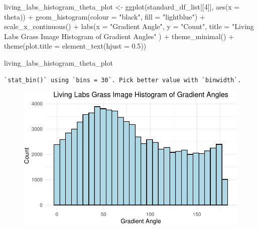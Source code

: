 \documentclass[
  letterpaper,
  DIV=11,
  numbers=noendperiod]{scrreprt}
\newenvironment{Shaded}{\begin{snugshade}}{\end{snugshade}}
\newcommand{\AttributeTok}[1]{\textcolor[rgb]{0.40,0.45,0.13}{#1}}
\newcommand{\DecValTok}[1]{\textcolor[rgb]{0.68,0.00,0.00}{#1}}
\newcommand{\FloatTok}[1]{\textcolor[rgb]{0.68,0.00,0.00}{#1}}
\newcommand{\FunctionTok}[1]{\textcolor[rgb]{0.28,0.35,0.67}{#1}}
\newcommand{\NormalTok}[1]{\textcolor[rgb]{0.00,0.23,0.31}{#1}}
\newcommand{\OtherTok}[1]{\textcolor[rgb]{0.00,0.23,0.31}{#1}}
\newcommand{\SpecialCharTok}[1]{\textcolor[rgb]{0.37,0.37,0.37}{#1}}
\newcommand{\StringTok}[1]{\textcolor[rgb]{0.13,0.47,0.30}{#1}}
\begin{document}
\begin{Shaded}
\begin{Highlighting}[]
\NormalTok{living\_labs\_histogram\_theta\_plot }\OtherTok{\textless{}{-}}
  \FunctionTok{ggplot}\NormalTok{(standard\_df\_list[[}\DecValTok{4}\NormalTok{]], }\FunctionTok{aes}\NormalTok{(}\AttributeTok{x =}\NormalTok{ theta)) }\SpecialCharTok{+}
  \FunctionTok{geom\_histogram}\NormalTok{(}\AttributeTok{colour =} \StringTok{"black"}\NormalTok{, }\AttributeTok{fill =} \StringTok{"lightblue"}\NormalTok{) }\SpecialCharTok{+}
  \FunctionTok{scale\_x\_continuous}\NormalTok{() }\SpecialCharTok{+} 
  \FunctionTok{labs}\NormalTok{(}\AttributeTok{x =} \StringTok{"Gradient Angle"}\NormalTok{, }
       \AttributeTok{y =} \StringTok{"Count"}\NormalTok{, }
       \AttributeTok{title =} \StringTok{"Living Labs Grass Image Histogram of Gradient Angles"}
\NormalTok{       ) }\SpecialCharTok{+}
  \FunctionTok{theme\_minimal}\NormalTok{() }\SpecialCharTok{+}
  \FunctionTok{theme}\NormalTok{(}\AttributeTok{plot.title =} \FunctionTok{element\_text}\NormalTok{(}\AttributeTok{hjust =} \FloatTok{0.5}\NormalTok{))}

\NormalTok{living\_labs\_histogram\_theta\_plot}
\end{Highlighting}
\end{Shaded}

\begin{verbatim}
`stat_bin()` using `bins = 30`. Pick better value with `binwidth`.
\end{verbatim}

\begin{figure}[H]

{\centering \includegraphics{results_files/figure-pdf/unnamed-chunk-12-2.pdf}

}

\end{figure}
\end{document}
